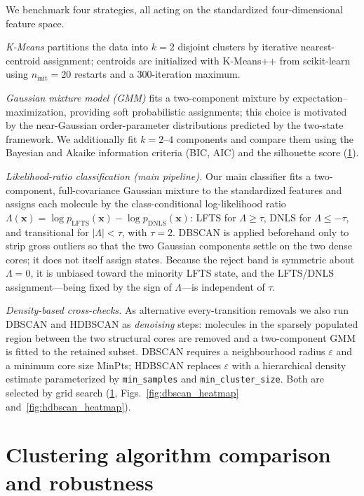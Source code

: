 \documentclass[aps,amsmath,amssymb,onecolumn,superscriptaddress,nofootinbib]{revtex4-2}
\begin{document}
We benchmark four strategies, all acting on the standardized four-dimensional
feature space.

\emph{K-Means} partitions the data into $k=2$
disjoint clusters by iterative nearest-centroid assignment; centroids are
initialized with K-Means++ from scikit-learn using
$n_{\mathrm{init}}=20$ restarts and a $300$-iteration maximum.

\emph{Gaussian mixture model (GMM)} fits a two-component
mixture by expectation--maximization, providing soft probabilistic assignments;
this choice is motivated by the near-Gaussian order-parameter distributions
predicted by the two-state framework. We additionally fit
$k=2$--$4$ components and compare them using the Bayesian and Akaike information
criteria (BIC, AIC) and the silhouette score (\ref{sn:robustness}).

\emph{Likelihood-ratio classification (main pipeline).} Our main classifier
fits a two-component, full-covariance Gaussian mixture to the standardized
features and assigns each molecule by the class-conditional log-likelihood ratio
$\Lambda(\mathbf{x})=\log p_{\mathrm{LFTS}}(\mathbf{x})-\log p_{\mathrm{DNLS}}(\mathbf{x})$:
LFTS for $\Lambda\geq\tau$, DNLS for $\Lambda\leq-\tau$, and transitional for
$|\Lambda|<\tau$, with $\tau=2$. DBSCAN is applied beforehand
only to strip gross outliers so that the two Gaussian components settle on the
two dense cores; it does not itself assign states. Because the reject band is
symmetric about $\Lambda=0$, it is unbiased toward the minority LFTS state, and
the LFTS/DNLS assignment---being fixed by the sign of $\Lambda$---is independent
of $\tau$.

\emph{Density-based cross-checks.} As alternative every-transition removals we
also run DBSCAN and HDBSCAN as \emph{denoising}
steps: molecules in the sparsely populated region between the two structural
cores are removed and a two-component GMM is fitted to the retained subset.
DBSCAN requires a neighbourhood radius $\varepsilon$ and a minimum core size
MinPts; HDBSCAN replaces $\varepsilon$ with a hierarchical density estimate
parameterized by \texttt{min\_samples} and \texttt{min\_cluster\_size}. Both are
selected by grid search (\ref{sn:robustness}, Figs.~\ref{fig:dbscan_heatmap}
and~\ref{fig:hdbscan_heatmap}).

\section{Clustering algorithm comparison and robustness}
\label{sn:robustness}
\end{document}
